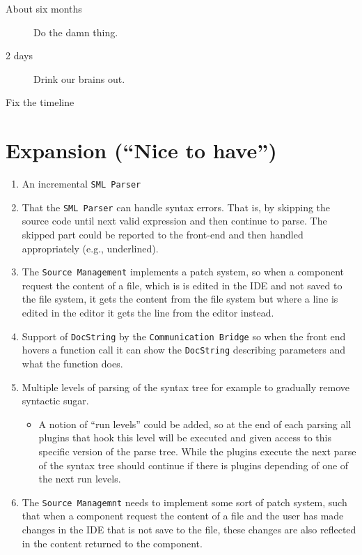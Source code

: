 \documentclass[a4paper,oneside]{memoir}
\begin{document}
\begin{description}
\item[About six months] Do the damn thing.
\item[2 days] Drink our brains out.
\item[Fix the timeline] 
\end{description}



\section{Expansion (``Nice to have'')}
\begin{enumerate}

\item An incremental \texttt{SML Parser}

\item That the \texttt{SML Parser} can handle syntax errors. That is,
  by skipping the source code until next valid expression and then
  continue to parse. The skipped part could be reported to the
  front-end and then handled appropriately (e.g., underlined).

\item The \texttt{Source Management} implements a patch system, so
  when a component request the content of a file, which is is edited
  in the IDE and not saved to the file system, it gets the content
  from the file system but where a line is edited in the editor it
  gets the line from the editor instead.


\item Support of \texttt{DocString} by the \texttt{Communication
    Bridge} so when the front end hovers a function call it can show
  the \texttt{DocString} describing parameters and what the function
  does.

\item Multiple levels of parsing of the syntax tree for example to gradually
  remove syntactic sugar.
  \begin{itemize}

  \item A notion of ``run levels'' could be added, so at the end of each parsing
    all plugins that hook this level will be executed and given access to this
    specific version of the parse tree. While the plugins execute the next parse
    of the syntax tree should continue if there is plugins depending of
    one of the next run levels.

  \end{itemize}

\item The \texttt{Source Managemnt} needs to implement some sort of patch
  system, such that when a component request the content of a file and the user
  has made changes in the IDE that is not save to the file, these changes are
  also reflected in the content returned to the component.

\end{enumerate}
\end{document}
